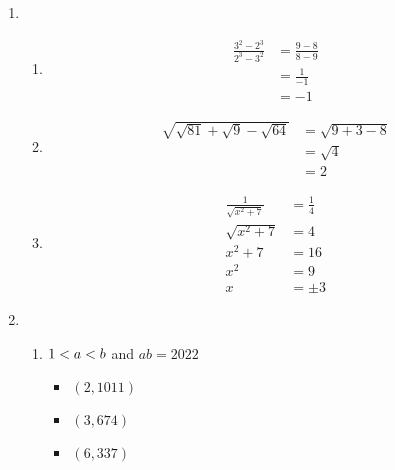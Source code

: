 \documentclass[11pt]{article}
\newcommand{\lt}{\ensuremath <}
\begin{document}
	\begin{enumerate}[{\bf Q1.}] 
	
	\item
  	\begin{enumerate}
		\item 

        \[
            \begin{aligned}
                \frac{3^2 - 2^3}{2^3 - 3^2} &= \frac{9 - 8}{8 - 9} \\
                &= \frac{1}{-1} \\
                &= -1
            \end{aligned}    
        \]

		\item 

        \[
            \begin{aligned}
                \sqrt{\sqrt{81} + \sqrt{9} - \sqrt{64}} &= \sqrt{9 + 3 - 8}\\
                &= \sqrt{4} \\
                &= 2
            \end{aligned}    
        \]

		\item 

        \[
            \begin{aligned}
                \frac{1}{\sqrt{x^2 + 7}} &= \frac{1}{4}\\
                \sqrt{x^2 + 7} &= 4\\
                x^2 + 7 &= 16\\
                x^2 &= 9\\
                x &= \pm 3
            \end{aligned}
        \]
		
	\end{enumerate}
	
	
	\newpage
	
    \item
  	\begin{enumerate}
		\item $1 \lt a \lt b$ and $ab = 2022$

        \begin{itemize}
            \item $(2, 1011)$ 
            \item $(3, 674)$
            \item $(6, 337)$
        \end{itemize}


\end{enumerate}
\end{enumerate}
\end{document}
